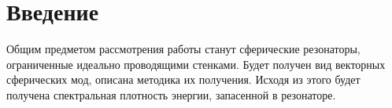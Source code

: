 %
%
%
%
%
%

\section*{Введение}

    Общим предметом рассмотрения работы станут сферические резонаторы, ограниченные идеально проводящими стенками. Будет получен вид векторных сферических мод, описана методика их получения. Исходя из этого будет получена спектральная плотность энергии, запасенной в резонаторе.
